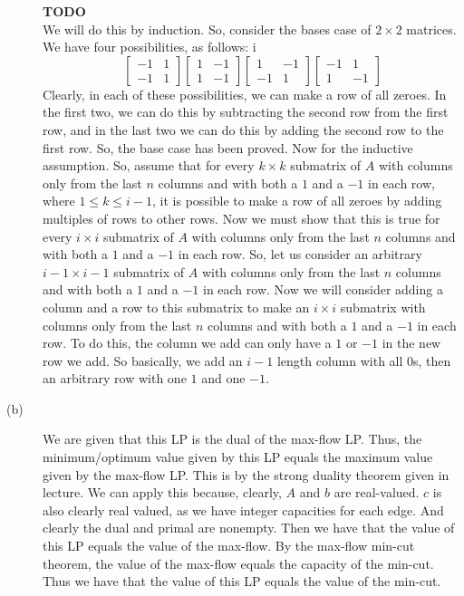 \documentclass{article}
\begin{document}
\begin{description}
        \vspace{5mm}
        \textbf{TODO} \\
        We will do this by induction. So, consider the bases case of
        $2 \times 2$ matrices. We have four possibilities, as follows:
        i\[ \begin{bmatrix}
        -1 & 1\\
        -1 & 1
        \end{bmatrix}
        \begin{bmatrix}
        1 & -1\\
        1 & -1
        \end{bmatrix}
        \begin{bmatrix}
        1 & -1\\
        -1 & 1
        \end{bmatrix}
        \begin{bmatrix}
        -1 & 1\\
        1 & -1
        \end{bmatrix}
        \]
        Clearly, in each of these possibilities, we can make a row of all
        zeroes. In the first two, we can do this by subtracting the second row
        from the first row, and in the last two we can do this by adding the
        second row to the first row. So, the base case has been proved. Now for
        the inductive assumption. So, assume that for every $k \times k$ submatrix of
        $A$ with columns only from the last $n$ columns and with both a $1$ and
        a $-1$ in each row, where $1 \le k \le i - 1$, it is possible to make a
        row of all zeroes by adding multiples of rows to other rows.
        Now we must show that this is true for every $i \times i$ submatrix of
        $A$  with columns only from the last $n$ columns and with both a $1$ and
        a $-1$ in each row. So, let us consider an arbitrary $i-1 \times i-1$
        submatrix of $A$ with columns only from the last $n$ columns and with
        both a $1$ and a $-1$ in each row. Now we will consider adding a column
        and a row to this submatrix to make an $i \times i$ submatrix with
        columns only from the last $n$ columns and with both a $1$ and a $-1$ in each row.
        To do this, the column we add can only have a $1$ or $-1$ in the new row
        we add. So basically, we add an $i-1$ length column with all $0$s, then
        an arbitrary row with one $1$ and one $-1$.
    \item[(b)] We are given that this LP is the dual of the max-flow LP. Thus,
        the minimum/optimum value given by this LP equals the maximum value
        given by the max-flow LP. This is by the strong duality theorem given in
        lecture. We can apply this because, clearly, $A$ and $b$ are
        real-valued. $c$ is also clearly real valued, as we have integer
        capacities for each edge. And clearly the dual and primal are nonempty.
        Then we have that the value of this LP equals the value of the max-flow.
        By the max-flow min-cut theorem, the value of the max-flow equals the
        capacity of the min-cut. Thus we have that the value of this LP equals
        the value of the min-cut.

\end{description}
\newpage

\end{document}
